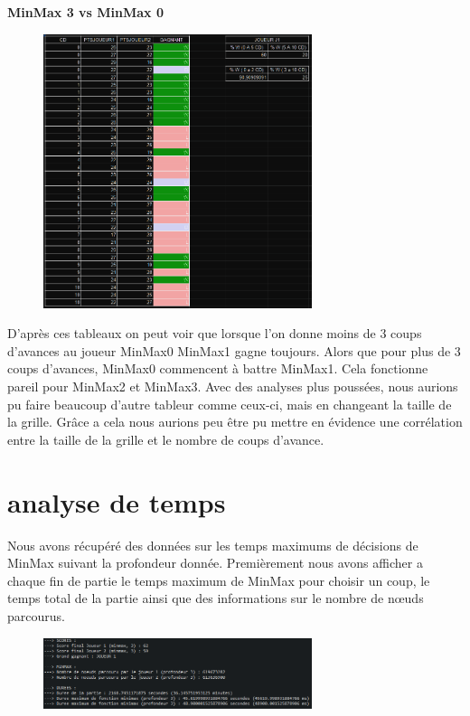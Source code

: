 \centering \textbf{MinMax 3 vs MinMax 0}
\begin{figure}[!ht]
\begin{center}
\includegraphics[width=0.70\textwidth]{./TABLEURDEEP3} 
\end{center}
\end{figure}


D'après ces tableaux on peut voir que lorsque l'on donne moins de 3 coups d'avances au joueur MinMax0
MinMax1 gagne toujours. Alors que pour plus de 3 coups d'avances, MinMax0 commencent à battre MinMax1.
Cela fonctionne pareil pour MinMax2 et MinMax3.
Avec des analyses plus poussées, nous aurions pu faire beaucoup d'autre tableur comme ceux-ci, mais 
en changeant la taille de la grille. Grâce a cela nous aurions peu être pu mettre en évidence 
une corrélation entre la taille de la grille et le nombre de coups d'avance.

\newpage
\section{analyse de temps}

Nous avons récupéré des données sur les temps maximums de décisions de MinMax suivant la profondeur
donnée.
Premièrement nous avons afficher a chaque fin de partie le temps maximum de MinMax pour choisir un coup,
le temps total de la partie ainsi que des informations sur le nombre de nœuds parcourus.

\begin{figure}[!ht]
\begin{center}
\includegraphics[width=0.70\textwidth]{./EXEMPLEANALYSEFINPARTIE}
\end{center}
\end{figure}

